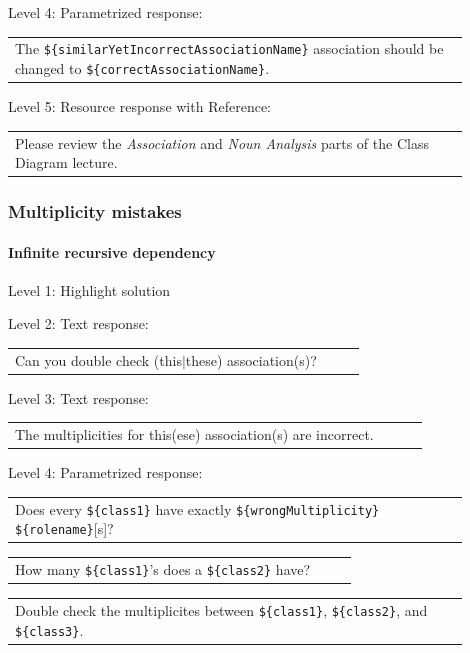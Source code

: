 \noindent Level 4: Parametrized response: \medskip

\begin{tabular}{|p{0.9\linewidth}}
The \verb|${similarYetIncorrectAssociationName}| association should be changed to \verb|${correctAssociationName}|.
\end{tabular} \medskip

\noindent Level 5: Resource response with Reference: \medskip

\begin{tabular}{|p{0.9\linewidth}}
Please review the \textit{Association} and \textit{Noun Analysis} parts of the Class Diagram lecture.
\end{tabular} \medskip


\subsubsection{Multiplicity mistakes}

\paragraph{Infinite recursive dependency}

\noindent Level 1: Highlight solution \medskip

\noindent Level 2: Text response: \medskip

\begin{tabular}{|p{0.9\linewidth}}
Can you double check (this$|$these) association(s)?
\end{tabular} \medskip

\noindent Level 3: Text response: \medskip

\begin{tabular}{|p{0.9\linewidth}}
The multiplicities for this(ese) association(s) are incorrect.
\end{tabular} \medskip

\noindent Level 4: Parametrized response: \medskip

\begin{tabular}{|p{0.9\linewidth}}
Does every \verb|${class1}| have exactly \verb|${wrongMultiplicity}| \verb|${rolename}|[s]?
\end{tabular} \medskip

\begin{tabular}{|p{0.9\linewidth}}
How many \verb|${class1}|'s does a \verb|${class2}| have?
\end{tabular} \medskip

\begin{tabular}{|p{0.9\linewidth}}
Double check the multiplicites between \verb|${class1}|, \verb|${class2}|, and \verb|${class3}|.
\end{tabular} \medskip

